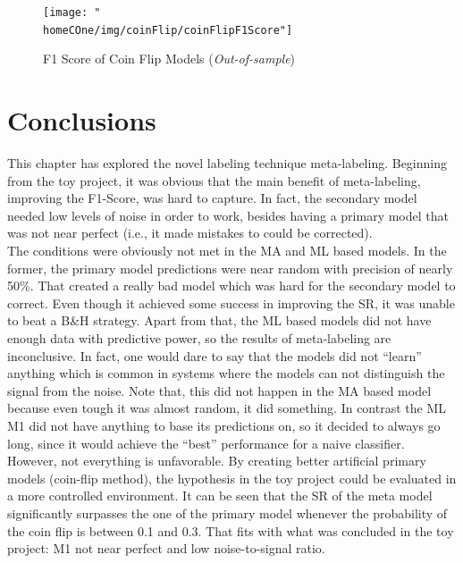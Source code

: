 \documentclass[a4paper]{article}
\newcommand{\homeCOne}{../../Chapter 1 - Metalabeling/Draft}
\begin{document}
\begin{figure}[htbp]
	\centering
	\texttt{[image: "\\homeCOne/img/coinFlip/coinFlipF1Score"]}
	\caption{F1 Score of Coin Flip Models (\textit{Out-of-sample})}
	\label{fig:coinFlipF1ScoreTest}
\end{figure}

\vspace{100cm}

\section{Conclusions}
This chapter has explored the novel labeling technique meta-labeling. 
Beginning from the toy project, it was obvious that the main benefit 
of meta-labeling, improving the F1-Score, was hard to capture. In 
fact, the secondary model needed low levels of noise in order to work, 
besides having a primary model that was not near perfect (i.e., it 
made mistakes to could be corrected).\\

The conditions were obviously not met in the MA and ML based models. 
In the former, the primary model predictions were near random with 
precision of nearly 50\%. That created a really bad model which was 
hard for the secondary model to correct. Even though it achieved some 
success in improving the SR, it was unable to beat a B\&H strategy. 
Apart from that, the ML based models did not have enough data with 
predictive power, so the results of meta-labeling are inconclusive. In 
fact, one would dare to say that the models did not ``learn'' anything 
which is common in systems where the models can not distinguish the 
signal from the noise. Note that, this did not happen in the MA based 
model because even tough it was almost random, it did something. In 
contrast the ML M1 did not have anything to base its predictions on, 
so it decided to always go long, since it would achieve the ``best'' 
performance for a naive classifier.\\

However, not everything is unfavorable. By creating better artificial 
primary models (coin-flip method), the hypothesis in the toy project 
could be evaluated in a more controlled environment. It can be seen 
that the SR of the meta model significantly surpasses the one of the 
primary model whenever the probability of the coin flip is between 0.1 
and 0.3. That fits with what was concluded in the toy project: M1 not 
near perfect and low noise-to-signal ratio.\\
\end{document}
